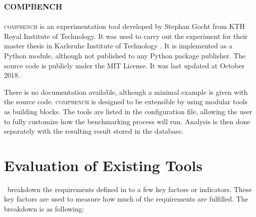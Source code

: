 \subsection{\textsc{compbench}}

\textsc{compbench} \citep{gochtPythonFrameworkRunning2018} is an experimentation tool developed by Stephan Gocht from KTH Royal Institute of Technology.
It was used to carry out the experiment for their master thesis in Karlsruhe Institute of Technology \citep{gochtIncrementalSATSolving}.
It is implemented as a Python module, although not published to any Python package publisher.
The source code is publicly under the MIT License.
It was last updated at October 2018.

There is no documentation available, although a minimal example is given with the source code.
\textsc{compbench} is designed to be extensible by using modular tools as building blocks.
The tools are listed in the configuration file, allowing the user to fully customize how the benchmarking process will run.
Analysis is then done separately with the resulting result stored in the database.


\section{Evaluation of Existing Tools}
\label{sec:existing.eval}

\First~breakdown the requirements defined in  to a few key factors or indicators.
These key factors are used to measure how much of the requirements are fulfilled.
The breakdown is as following:

